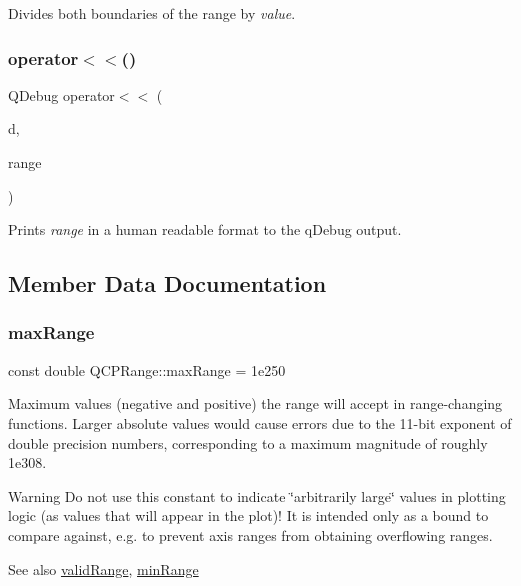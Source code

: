 Divides both boundaries of the range by {\itshape value}. \mbox{\label{class_q_c_p_range_ab4b7d434541ec2e2e00ef3764dde90d8}} 
\subsubsection{\texorpdfstring{operator$<$$<$()}{operator<<()}}
{\footnotesize\ttfamily Q\+Debug operator$<$$<$ (\begin{DoxyParamCaption}\item[{Q\+Debug}]{d,  }\item[{const \hyperlink{class_q_c_p_range}{Q\+C\+P\+Range} \&}]{range }\end{DoxyParamCaption})\hspace{0.3cm}{\ttfamily [related]}}

Prints {\itshape range} in a human readable format to the q\+Debug output. 

\subsection{Member Data Documentation}
\mbox{\label{class_q_c_p_range_a5ca51e7a2dc5dc0d49527ab171fe1f4f}} 
\subsubsection{\texorpdfstring{max\+Range}{maxRange}}
{\footnotesize\ttfamily const double Q\+C\+P\+Range\+::max\+Range = 1e250\hspace{0.3cm}{\ttfamily [static]}}

Maximum values (negative and positive) the range will accept in range-\/changing functions. Larger absolute values would cause errors due to the 11-\/bit exponent of double precision numbers, corresponding to a maximum magnitude of roughly 1e308.

\begin{DoxyWarning}{Warning}
Do not use this constant to indicate \char`\"{}arbitrarily large\char`\"{} values in plotting logic (as values that will appear in the plot)! It is intended only as a bound to compare against, e.\+g. to prevent axis ranges from obtaining overflowing ranges.
\end{DoxyWarning}
\begin{DoxySeeAlso}{See also}
\hyperlink{class_q_c_p_range_ab38bd4841c77c7bb86c9eea0f142dcc0}{valid\+Range}, \hyperlink{class_q_c_p_range_ab46d3bc95030ee25efda41b89e2b616b}{min\+Range} 
\end{DoxySeeAlso}
\mbox{\label{class_q_c_p_range_ab46d3bc95030ee25efda41b89e2b616b}} 
